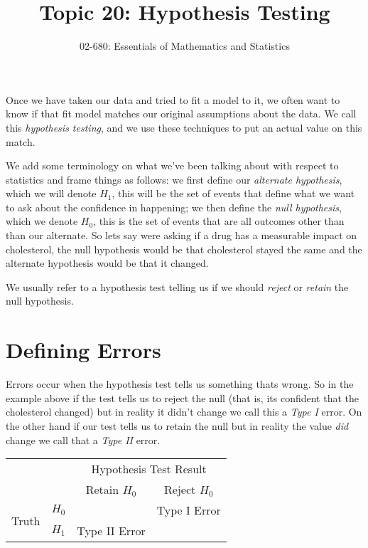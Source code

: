 

\title{Topic 20: Hypothesis Testing}
\author{02-680: Essentials of Mathematics and Statistics}


\maketitle

Once we have taken our data and tried to fit a model to it, 
we often want to know if that fit model matches our original assumptions about the data. 
We call this \emph{hypothesis testing}, 
and we use these techniques to put an actual value on this match. 

We add some terminology on what we've been talking about with respect to statistics 
and frame things as follows: 
we first define our \emph{alternate hypothesis}, which we will denote $H_1$, 
this will be the set of events that define what we want to ask about the confidence in happening; 
we then define the \emph{null hypothesis}, which we denote $H_0$, 
this is the set of events that are all outcomes other than than our alternate. 
So lets say were asking if a drug has a measurable impact on cholesterol, 
the null hypothesis would be that cholesterol stayed the same 
and the alternate hypothesis would be that it changed. 

We usually refer to a hypothesis test telling us if we should \emph{reject} or \emph{retain} the null hypothesis. 

\section{Defining Errors}
Errors occur when the hypothesis test tells us something thats wrong. 
So in the example above 
if the test tells us to reject the null (that is, its confident that the cholesterol changed) 
but in reality it didn't change we call this a \emph{Type I} error. 
On the other hand if our test tells us to retain the null but in reality the value \textit{did} change 
we call that a \emph{Type II} error. 

\begin{center}
\begin{tabular}{|cc||c|c|}
\hline
&& \multicolumn{2}{c|}{Hypothesis Test Result}\\
&& Retain $H_0$ & Reject $H_0$\\
\hline \hline
\multirow{2}{*}{Truth} & $H_0$ & & Type I Error\\
\cline{2-4}
& $H_1$ & Type II Error & \\
\hline
\end{tabular}
\end{center}

